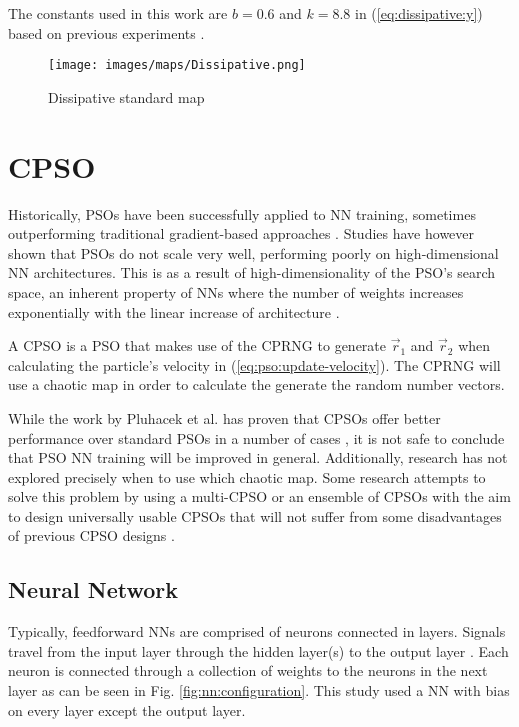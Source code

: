 \documentclass[conference]{IEEEtran}
\begin{document}
	\noindent The constants used in this work are $ b = 0.6 $ and $ k = 8.8 $ in (\ref{eq:dissipative:y}) based on previous experiments \cite{pluhacek:cpso-cprng-imp}.
	
	\begin{figure}[htbp]
\centerline{\texttt{[image: images/maps/Dissipative.png]}}
\caption{Dissipative standard map}
\label{fig:map:dissipative}
\end{figure}

    
\section{\ac{CPSO}}
Historically, \ac{PSO}s have been successfully applied to \ac{NN} training, sometimes outperforming traditional gradient-based approaches \cite{anna:saturation-psonn, anna:meas-sat-nn}. Studies have however shown that \ac{PSO}s do not scale very well, performing poorly on high-dimensional \ac{NN} architectures. This is as a result of high-dimensionality of the \ac{PSO}'s search space, an inherent property of \ac{NN}s where the number of weights increases exponentially with the linear increase of architecture \cite{anna:saturation-psonn}. 

A \ac{CPSO} is a \ac{PSO} that makes use of the \ac{CPRNG} to generate $ \vec{r}_{1} $ and $ \vec{r}_{2} $ when calculating the particle's velocity in (\ref{eq:pso:update-velocity}). The \ac{CPRNG} will use a chaotic map in order to calculate the generate the random number vectors.

While the work by Pluhacek et al. has proven that \ac{CPSO}s offer better performance over standard \ac{PSO}s in a number of cases \cite{pluhacek:cpso-cprng-imp, pluhacek:ms-cpso, pluhacek:cpso-esb-chaotic}, it is not safe to conclude that \ac{PSO} \ac{NN} training will be improved in general.  Additionally, research has not explored precisely when to use which chaotic map. Some research \cite{pluhacek:cpso-esb-chaotic, pluhacek:ms-cpso} attempts to solve this problem by using a multi-\ac{CPSO} or an ensemble of \ac{CPSO}s with the aim to design universally usable \ac{CPSO}s that will not suffer from some disadvantages of previous \ac{CPSO} designs \cite{pluhacek:pso-mutichaotic-ng}.

\subsection{Neural Network}
Typically, feedforward \ac{NN}s are comprised of neurons connected in layers. Signals travel from the input layer through the hidden layer(s) to the output layer \cite{anna:meas-sat-nn}. Each neuron is connected through a collection of weights to the neurons in the next layer as can be seen in Fig. \ref{fig:nn:configuration}. This study used a \ac{NN} with bias on every layer except the output layer.
\end{document}

